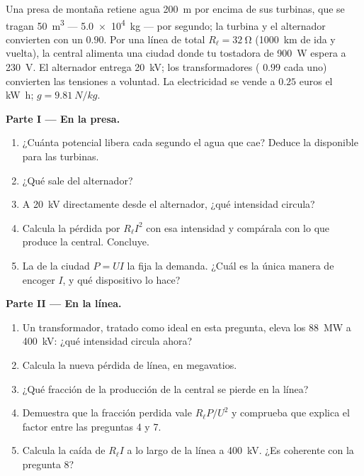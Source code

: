\begin{problem}
\label{pb:g11:circuits-and-power:1}
Una presa de montaña retiene agua \qty{200}{m} por encima de sus
turbinas, que se tragan \qty{50}{m^3} --- \qty{5.0e4}{kg} --- por
segundo; la turbina y el alternador convierten con un 
$0.90$. Por una línea de  total
$R_\ell = \qty{32}{\ohm}$ (\qty{1000}{km} de ida y vuelta), la central
alimenta una ciudad donde tu tostadora de \qty{900}{W} espera a
\qty{230}{V}. El alternador entrega \qty{20}{kV}; los transformadores
( $0.99$ cada uno) convierten las tensiones a voluntad. La
electricidad se vende a $0.25$ euros el \unit{kW.h};
$g = \qty{9.81}{N/kg}$.

\medskip
\noindent\textbf{Parte I --- En la presa.}
\begin{enumerate}
  \item ¿Cuánta  potencial libera cada segundo el agua que cae?
        Deduce la  disponible para las turbinas.
  \item ¿Qué  sale del alternador?
  \item A \qty{20}{kV} directamente desde el alternador, ¿qué intensidad
        circula?
  \item Calcula la pérdida por  $R_\ell I^2$ con esa
        intensidad y compárala con lo que produce la central. Concluye.
  \item La  de la ciudad $P = UI$ la fija la demanda. ¿Cuál es
        la única manera de encoger $I$, y qué dispositivo lo hace?
\end{enumerate}

\medskip
\noindent\textbf{Parte II --- En la línea.}
\begin{enumerate}[resume]
  \item Un transformador, tratado como ideal en esta pregunta, eleva los
        \qty{88}{MW} a \qty{400}{kV}: ¿qué intensidad circula ahora?
  \item Calcula la nueva pérdida de línea, en megavatios.
  \item ¿Qué fracción de la producción de la central se pierde en la
        línea?
  \item Demuestra que la fracción perdida vale $R_\ell P/U^2$ y
        comprueba que explica el factor entre las preguntas 4 y 7.
  \item Calcula la caída de  $R_\ell I$ a lo largo de la línea a
        \qty{400}{kV}. ¿Es coherente con la pregunta 8?
\end{enumerate}


\end{problem}
